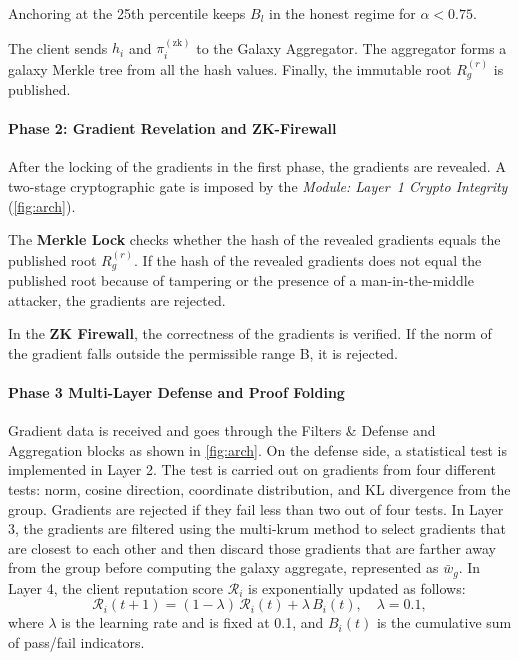 \documentclass[10pt,twocolumn,letterpaper]{article}
\begin{document}
Anchoring at the 25th percentile keeps $B_l$ in the honest regime for $\alpha < 0.75$.

The client sends $h_i$ and $\pi_i^{(\mathrm{zk})}$ to the Galaxy Aggregator. 
The aggregator forms a galaxy Merkle tree from all the hash values. Finally, the immutable root $R_g^{(r)}$ is published.

\paragraph{Phase 2: Gradient Revelation and ZK-Firewall}
After the locking of the gradients in the first phase, the gradients are revealed. A two-stage cryptographic gate is imposed by the \textit{Module: Layer~1 Crypto Integrity} (\cref{fig:arch}).

The \textbf{Merkle Lock} checks whether the hash of the revealed gradients equals the published root $R_g^{(r)}$. If the hash of the revealed gradients does not equal the published root because of tampering or the presence of a man-in-the-middle attacker, the gradients are rejected.

In the \textbf{ZK Firewall}, the correctness of the gradients is verified. If the norm of the gradient falls outside the permissible range B, it is rejected.


\paragraph{Phase 3  Multi-Layer Defense and Proof Folding}
Gradient data is received and goes through the Filters \& Defense and Aggregation blocks as shown in \cref{fig:arch}.
On the defense side, a statistical test is implemented in Layer 2. The test is carried out on gradients from four different tests: norm, cosine direction, coordinate distribution, and KL divergence from the group. Gradients are rejected if they fail less than two out of four tests.
In Layer 3, the gradients are filtered using the multi-krum method to select gradients that are closest to each other and then discard those gradients that are farther away from the group before computing the galaxy aggregate, represented as $\bar{w}_g$. In Layer 4, the client reputation score $\mathcal{R}_i$ is exponentially updated as follows:
\begin{equation}
\label{eq:reputation}
\mathcal{R}_i(t{+}1) = (1-\lambda)\,\mathcal{R}_i(t) + \lambda\, B_i(t), \quad \lambda = 0.1,
\end{equation}
where $\lambda$ is the learning rate and is fixed at 0.1, and $B_i(t)$ is the cumulative sum of pass/fail indicators.
\end{document}
